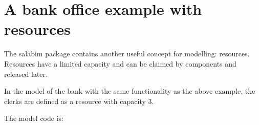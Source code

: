 \documentclass[letterpaper,10pt,english]{sphinxmanual}
\begin{document}
\begin{sphinxVerbatim}[commandchars=\\\{\}]
  


\end{sphinxVerbatim}


\section{A bank office example with resources}
\label{\detokenize{Modeling:a-bank-office-example-with-resources}}
The salabim package contains another useful concept for modelling: resources.
Resources have a limited capacity and can be claimed by components and released later.

In the model of the bank with the same functionality as the above example, the
clerks are defined as a resource with capacity 3.

The model code is:
\end{document}
